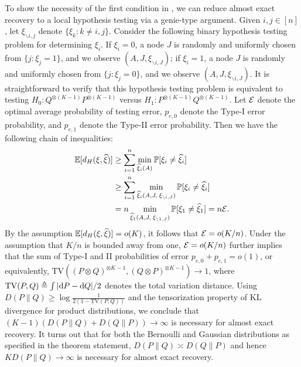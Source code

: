 To show the necessity of the first condition in , we can reduce almost exact recovery to a local hypothesis testing via a genie-type argument.  Given $i,j \in [n]$, let $\xi_{\backslash i,j}$ denote $\{\xi_k\colon k \neq i,j\}$.
Consider the following binary hypothesis testing problem for determining $\xi_i$.
If $\xi_i=0$, a node $J$ is randomly and uniformly chosen from $\{j\colon \xi_j=1\}$, and we observe $(A, J, \xi_{\backslash i, J })$;
if $\xi_i=1$, a node $J$ is randomly and uniformly chosen from $\{j\colon \xi_j=0 \}$, and we observe $(A, J, \xi_{\backslash i, J } )$.
It is straightforward to verify that this hypothesis testing problem is equivalent to 
testing $H_0:Q^{\otimes (K-1)} P^{\otimes (K-1)}$ versus
 $H_1: P^{\otimes (K-1)} Q^{\otimes (K-1)}$.
 Let ${\mathcal{E}}$ denote the optimal average probability of testing error, 
 $p_{e,0}$ denote the Type-I error probability, and $p_{e,1}$ denote the Type-II error probability. 
Then we have the following chain of inequalities:
\begin{align*}
\mathbb{E}[d_H(\xi, \widehat \xi)]  &  \geq \sum_{i=1}^n \min_{\widehat \xi_i(A)} \mathbb{P}[\xi_i \neq  \widehat \xi_i] 	  \\
& \geq  \sum_{i=1}^n \min_{\widehat \xi_i ( A, J, \; \xi_{\backslash i, J})} \mathbb{P}[\xi_i \neq  \widehat \xi_i]  \\
& =  n \min_{\widehat \xi_1(A, J, \; \xi_{\backslash 1, J})} \mathbb{P}[\xi_1 \neq  \widehat \xi_1] 	= n{\mathcal{E}}. 
\end{align*}
By the assumption $\mathbb{E}[d_H(\xi, \widehat \xi)]  =o(K)$, it follows that
${\mathcal{E}} =o(K/n)$. Under the assumption that $K/n$ is bounded away from one, ${\mathcal{E}} =o(K/n)$ further 
implies that the sum of Type-I and II probabilities of error
$p_{e,0} + p_{e,1} = o(1)$, or equivalently,
$\text{TV}((P\otimes Q)^{\otimes K-1},(Q \otimes P)^{\otimes K-1}) \to 1$, where $\text{TV}(P,Q) \triangleq \int |{\rm d} P-{\rm d} Q|/2$ denotes the total variation distance.
Using $D(P\|Q) \geq \log \frac{1}{2(1-\text{TV}(P,Q))}$ \cite[Eqn.~(2.25)]{Tsybakov09} and the tensorization property of KL divergence for product distributions,
we conclude that 
$
(K-1)(D(P\|Q)+D(Q\|P)) \to \infty
$ 
is necessary for almost exact recovery. %
It turns out that for both the Bernoulli and Gaussian distributions as specified in
the theorem statement, $D(P\|Q) \asymp D(Q\|P)$ and hence $K D(P\|Q) \to \infty$
is necessary for almost exact recovery. 


